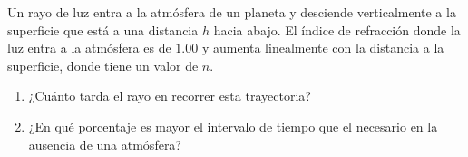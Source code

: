 \item Un rayo de luz entra a la atmósfera de un planeta y desciende verticalmente a la superficie que está a una distancia $h$ hacia abajo. El índice de refracción donde la luz entra a la atmósfera es de $1.00$ y aumenta linealmente con la distancia a la superficie, donde tiene un valor de $n$.
\begin{enumerate}
    \item ¿Cuánto tarda el rayo en recorrer esta trayectoria?
    \item ¿En qué porcentaje es mayor el intervalo de tiempo que el necesario en la ausencia de una atmósfera?
\end{enumerate}